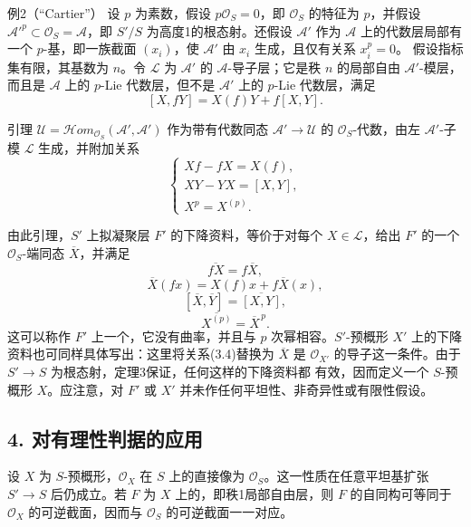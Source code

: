 \begin{statement}{例2（“Cartier”）}
设 $p$ 为素数，假设 $p\mathcal O_S=0$，即 $\mathcal O_S$ 的特征为 $p$，并假设 $\mathcal A'^p\subset\mathcal O_S=\mathcal A$，即 $S'/S$ 为高度1的根态射。还假设 $\mathcal A'$ 作为 $\mathcal A$ 上的代数层局部有一个 $p$-基，即一族截面 $(x_i)$，使 $\mathcal A'$ 由 $x_i$ 生成，且仅有关系 $x_i^p=0$。
假设指标集有限，其基数为 $n$。令 $\mathcal L$ 为 $\mathcal A'$ 的 $\mathcal A$-导子层；它是秩 $n$ 的局部自由 $\mathcal A'$-模层，而且是 $\mathcal A$ 上的 $p$-Lie 代数层，但不是 $\mathcal A'$ 上的 $p$-Lie 代数层，满足
\[
[X,fY]=X(f)Y+f[X,Y].
\tag{3.5}
\]
\begin{statement}{引理}
$\mathcal U=\mathcal H\!om_{\mathcal O_S}(\mathcal A',\mathcal A')$ 作为带有代数同态 $\mathcal A'\to\mathcal U$ 的 $\mathcal O_S$-代数，由左 $\mathcal A'$-子模 $\mathcal L$ 生成，并附加关系
\[
\begin{cases}
Xf-fX=X(f),\\
XY-YX=[X,Y],\\
X^p=X^{(p)}.
\end{cases}
\tag{3.6}
\]
\end{statement}
由此引理，$S'$ 上拟凝聚层 $F'$ 的下降资料，等价于对每个 $X\in\mathcal L$，给出 $F'$ 的一个 $\mathcal O_S$-端同态 $\overline X$，并满足
\[
\overline{fX}=f\overline X,
\tag{3.7}
\]
\[
\overline X(fx)=X(f)x+f\overline X(x),
\tag{3.8}
\]
\[
[\overline X,\overline Y]=\overline{[X,Y]},
\tag{3.9}
\]
\[
\overline{X^{(p)}}=\overline X^{\,p}.
\tag{3.10}
\]
这可以称作 $F'$ 上一个，它没有曲率，并且与 $p$ 次幂相容。$S'$-预概形 $X'$ 上的下降资料也可同样具体写出：这里将关系(3.4)替换为 $\overline X$ 是 $\mathcal O_{X'}$ 的导子这一条件。由于 $S'\to S$ 为根态射，定理3保证，任何这样的下降资料都
有效，因而定义一个 $S$-预概形 $X$。应注意，对 $F'$ 或 $X'$ 并未作任何平坦性、非奇异性或有限性假设。
\end{statement}

\subsection*{4. 对有理性判据的应用}
设 $X$ 为 $S$-预概形，$\mathcal O_X$ 在 $S$ 上的直接像为 $\mathcal O_S$。这一性质在任意平坦基扩张 $S'\to S$ 后仍成立。若 $F$ 为 $X$ 上的，即秩1局部自由层，则 $F$ 的自同构可等同于 $\mathcal O_X$ 的可逆截面，因而与 $\mathcal O_S$ 的可逆截面一一对应。

